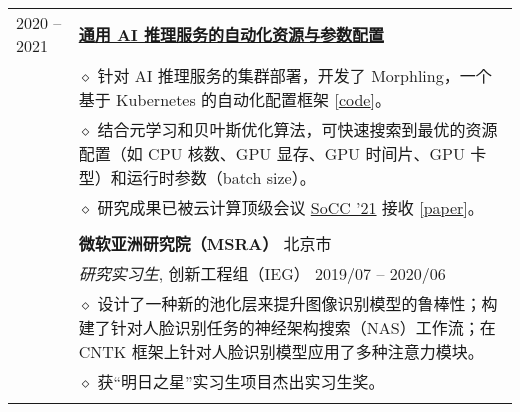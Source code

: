 \documentclass[letterpaper, 10pt]{article}
\begin{document}
\begin{longtable}{p{0.7in}p{6.0in}}
2020 -- 2021
& \textbf{\underline{通用 AI 推理服务的自动化资源与参数配置}} \hfill \\
    & $\diamond$ 针对 AI 推理服务的集群部署，开发了 Morphling，一个基于 Kubernetes 的自动化配置框架 [\href{https://github.com/kubedl-io/morphling}{\underline{code}}]。\\
    & $\diamond$ 结合元学习和贝叶斯优化算法，可快速搜索到最优的资源配置（如 CPU 核数、GPU 显存、GPU 时间片、GPU 卡型）和运行时参数（batch size）。\\
    & $\diamond$ 研究成果已被云计算顶级会议 \underline{SoCC '21} 接收 [\href{https://dl.acm.org/doi/10.1145/3472883.3486987}{\underline{paper}}]。\\
& \\

& {\textbf{微软亚洲研究院（MSRA）}} \hfill 北京市\\
& \textit{研究实习生}, 创新工程组（IEG） \hfill 2019/07 -- 2020/06 \\
& $\diamond$ 设计了一种新的池化层来提升图像识别模型的鲁棒性；构建了针对人脸识别任务的神经架构搜索（NAS）工作流；在 CNTK 框架上针对人脸识别模型应用了多种注意力模块。\\
& $\diamond$ 获“明日之星”实习生项目杰出实习生奖。\\
& \\


\end{longtable}
\end{document}
